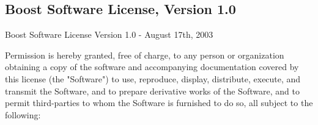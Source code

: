 %
%
%
%
%
%
%
%


\newpage
\subsection{Boost Software License, Version 1.0}
\label{BoostSoftwareLicense1}
\begin{center}
	Boost Software License
	Version 1.0 - August 17th, 2003
\end{center}

Permission is hereby granted, free of charge, to any person or organization
obtaining a copy of the software and accompanying documentation covered by
this license (the "Software") to use, reproduce, display, distribute,
execute, and transmit the Software, and to prepare derivative works of the
Software, and to permit third-parties to whom the Software is furnished to
do so, all subject to the following:

